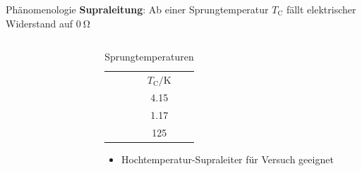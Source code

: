 \begin{frame}{Phänomenologie}
\textbf{Supraleitung}: Ab einer Sprungtemperatur $T_{\mathup{C}}$ fällt elektrischer Widerstand auf $\SI{0}{\ohm}$ \\
\begin{columns}
\begin{column}{0.49\textwidth}
  \begin{figure}
    \label{fig: hg_supraleitung}
  \end{figure}
\end{column}
\begin{column}{0.49\textwidth}

\begin{table}
  \caption{Sprungtemperaturen \cite{dem2}}
  \label{tab: sprungtemperaturen}
\begin{tabular}{l S}
  & $T_{\mathup{C}} / \si{\kelvin}$ \\
   & \num{4.15} \\
     & \num{1.17} \\
       & \num{125}
\end{tabular}
\end{table}
\begin{itemize}
  \item Hochtemperatur-Supraleiter für Versuch geeignet
\end{itemize}

\end{column}
\end{columns}
\end{frame}



